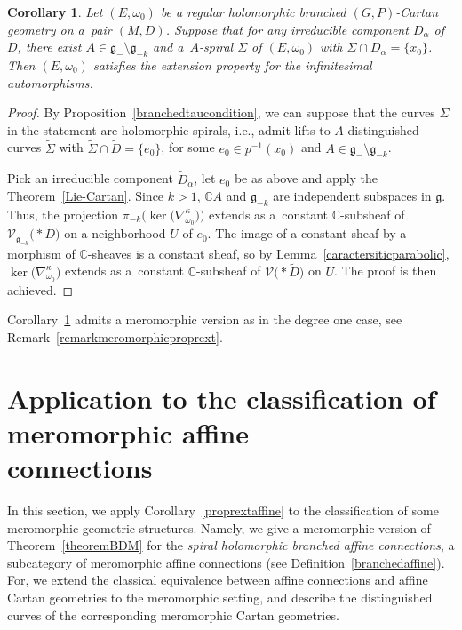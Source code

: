 \documentclass[pdftex]{sigma}
\numberwithin{equation}{section}
\newtheorem{Corollary}[Theorem]{Corollary}
\begin{document}
\begin{Corollary}\label{proprextparab} Let $(E,\omega_0)$ be a regular holomorphic branched $(G,P)$-Cartan geometry on a~pair $(M,D)$. Suppose that for any irreducible component $D_\alpha$ of $D$, there exist $A\in \mathfrak{g}_-\setminus \mathfrak{g}_{-k}$ and a~$A$-spiral $\Sigma$ of $(E,\omega_0)$ with $\Sigma\cap D_\alpha =\{x_0\}$. Then $(E,\omega_0)$ satisfies the extension property for the infinitesimal automorphisms.
\end{Corollary}
\begin{proof} By Proposition~\ref{branchedtaucondition}, we can suppose that the curves $\Sigma$ in the statement are holomorphic spirals, i.e., admit lifts to $A$-distinguished curves $\tilde{\Sigma}$ with $\tilde{\Sigma}\cap \tilde{D} = \{e_0\}$, for some $e_0 \in p^{-1}(x_0)$ and $A\in \mathfrak{g}_-\setminus \mathfrak{g}_{-k}$.

 Pick an irreducible component $\tilde{D}_\alpha$, let $e_0$ be as above and apply the Theorem~\ref{Lie-Cartan}. Since $k>1$, $\mathbb{C}A$ and $\mathfrak{g}_{-k}$ are independent subspaces in $\mathfrak{g}$. Thus, the projection $\pi_{-k}\big(\ker\big(\nabla^\kappa_{\omega_0}\big)\big)$ extends as a~constant $\mathbb{C}$-subsheaf of $\mathcal{V}_{\mathfrak{g}_{-k}}\bigl(* \tilde{D}\bigr)$ on a neighborhood $U$ of $e_0$. The image of a constant sheaf by a morphism of $\mathbb{C}$-sheaves is a constant sheaf, so by Lemma~\ref{caractersiticparabolic}, $\ker\big(\nabla^{\kappa}_{\omega_0}\big)$ extends as a~constant $\mathbb{C}$-subsheaf of $\mathcal{V}\bigl(* \tilde{D}\bigr)$ on $U$. The proof is then achieved.
\end{proof}

\begin{Remark} Corollary~\ref{proprextparab} admits a meromorphic version as in the degree one case, see Remark~\ref{remarkmeromorphicproprext}. \end{Remark}
\section[Application to the classification of meromorphic affine connections]{Application to the classification of meromorphic affine \\ connections}\label{section4}

In this section, we apply Corollary~\ref{proprextaffine} to the classification of some meromorphic geometric structures. Namely, we give a meromorphic version of Theorem~\ref{theoremBDM} for the \textit{spiral holomorphic branched affine connections}, a subcategory of meromorphic affine connections (see Definition~\ref{branchedaffine}). For, we extend the classical equivalence between affine connections and affine Cartan geometries to the meromorphic setting, and describe the distinguished curves of the corresponding meromorphic Cartan geometries.
\end{document}
